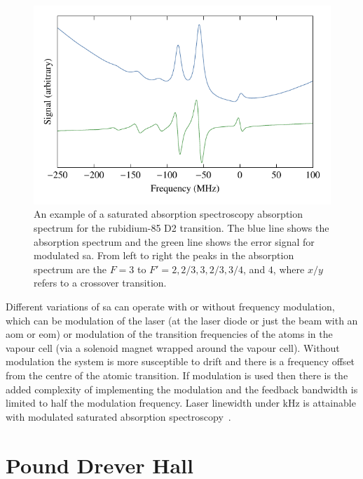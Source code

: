 \begin{figure}
    \center
    \includegraphics{part1/Figs/SatAbsSpectrum.pdf}
    \caption[Saturated absorption spectroscopy absorption spectrum.]{An example of a saturated absorption spectroscopy absorption spectrum for the rubidium-85 D2 transition.
    The blue line shows the absorption spectrum and the green line shows the error signal for modulated \gls{sa}.
    From left to right the peaks in the absorption spectrum are the $F=3$ to $F'=2,2/3,3,2/3,3/4$, and $4$, where $x/y$ refers to a crossover transition.}
    \label{figure:satabsspectrum}
\end{figure}

Different variations of \gls{sa} can operate with or without frequency modulation, which can be modulation of the laser (at the laser diode or just the beam with an \gls{aom} or \gls{eom}) or modulation of the transition frequencies of the atoms in the vapour cell (via a solenoid magnet wrapped around the vapour cell).
Without modulation the system is more susceptible to drift and there is a frequency offset from the centre of the atomic transition.
If modulation is used then there is the added complexity of implementing the modulation and the feedback bandwidth is limited to half the modulation frequency.
Laser linewidth under \unit[150]{kHz} is attainable with modulated saturated absorption spectroscopy~\cite{saliba_linewidths_2009}.

\section{Pound Drever Hall}

